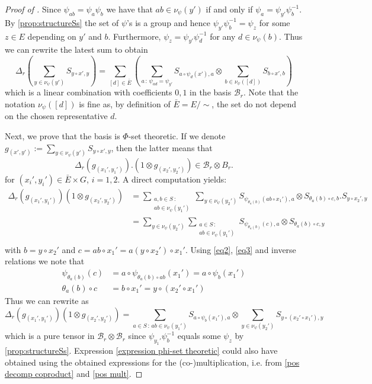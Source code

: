 \documentclass[a4paper,10pt]{amsart}
\theoremstyle{definition}
\theoremstyle{remark}
\newcommand\D{\Delta}
\newcommand\ot{\otimes}
\newcommand\mc{\mathcal}
\begin{document}
\begin{proof}[Proof of ]
Since $\psi_{ab}=\psi_a\psi_b$ we have that $ab \in \nu_{\psi}(y')$ if and only if $\psi_a = \psi_{y'}\psi_b^{-1}$. By \cref{prop:structureSs} the set of $\psi$'s is a group and hence $\psi_{y'}\psi_b^{-1} = \psi_z$ for some $z \in E$ depending on $y'$ and $b$. Furthermore, $\psi_z = \psi_{y'}\psi_d^{-1}$ for any $d \in \nu_{\psi}(b)$. Thus we can rewrite the latest sum to obtain 
\begin{equation}\label{pos decomp coproduct}
\D_r(\sum_{y\in \nu_{\psi}(y')}S_{y\circ x',y})= \sum_{[d] \in \bar{E}}\left( \sum_{a \, : \, \psi_{ad}= \psi_{y'}} S_{a \circ \psi_d(x'), a} \ot \sum_{b \in \nu_{\psi}([d])}S_{b\circ x',b}\right)
\end{equation}
which is a linear combination with coefficients $0,1$ in the basis $\mc{B}_r.$ Note that the notation $\nu_{\psi}([d])$ is fine as, by definition of $\bar{E} =E / \sim$, the set do not depend on the chosen representative $d$.\medskip

Next, we prove that the basis is $\Phi$-set theoretic. If we denote $g_{(x',y')}:= \sum_{y\in \nu_{\psi}(y')}S_{y\circ x',y}$, then the latter means that
$$\D_r(g_{(x_1',y_1')}).(1 \ot g_{(x_2',y_2')}) \in \mc{B}_r \ot \mc{}B_r.$$
for $(x_i',y_i') \in \bar{E} \times G$, $i=1,2$. A direct computation yields:
\begin{align*}
\D_r(g_{(x_1',y_1')})(1 \ot g_{(x_2',y_2')} ) & = \sum_{\substack{a,b \in S\ : \\ ab \in \nu_{\psi}(y_1')}} \sum_{y \in \nu_{\psi}(y_2')} S_{\psi_{\theta_a(b)}(ab \circ x_1'), a} \ot S_{\theta_a(b)\circ c, b}.S_{y \circ x_2',y} \\
& = \sum_{y \in \nu_{\psi}(y_2')} \sum\limits_{\substack{a \in S \, : \,\\ ab \in \nu_{\psi}(y_1')}} S_{\psi_{\theta_a(b)}(c),a} \ot S_{\theta_a(b)\circ c,y} \\
\end{align*}
with $b = y\circ x_2' $ and $c = ab \circ x_1'= a(y\circ x_2')\circ x_1'$. Using \eqref{eq2}, \eqref{eq3} and inverse relations we note that
\begin{align*}
\psi_{\theta_a(b)}(c) &= a \circ \psi_{\theta_a(b)\circ ab}(x_1') = a \circ\psi_{b}(x_1') \\
\theta_a(b)\circ c & = b\circ x_1' = y\circ (x_2' \circ x_1')
\end{align*}
Thus we can rewrite as
\begin{equation}\label{expression phi-set theoretic}
\D_r(g_{(x_1',y_1')})(1 \ot g_{(x_2',y_2')} ) = \sum\limits_{a \in S \, : \, ab \in \nu_{\psi}(y_1')} S_{a \circ\psi_{b}(x_1'),a} \ot  \sum_{y \in \nu_{\psi}(y_2')} S_{y\circ (x_2' \circ x_1'), y}
\end{equation}
which is a pure tensor in $\mc{B}_r \ot \mc{B}_r$ since $\psi_{y_1'}\psi_b^{-1}$ equals some $\psi_z$ by \cref{prop:structureSs}. Expression \eqref{expression phi-set theoretic} could also have obtained using the obtained expressions for the (co-)multiplication, i.e. from \eqref{pos decomp coproduct} and \eqref{pos mult}. \medskip



\end{proof}
\end{document}
